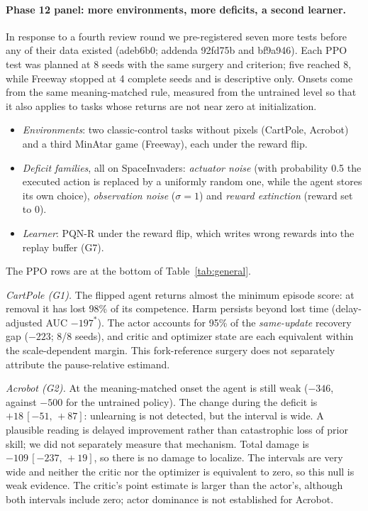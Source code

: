 \documentclass[10pt]{article} %
\newcommand{\sig}{^{\ast}}
\newcommand{\ci}[2]{\,[#1,\,#2]}
\begin{document}
\paragraph{Phase 12 panel: more environments, more deficits, a second learner.}
In response to a fourth review round we pre-registered seven more tests before any of their data existed (adeb6b0; addenda 92fd75b and bf9a946). Each PPO test was planned at 8 seeds with the same surgery and criterion; five reached 8, while Freeway stopped at 4 complete seeds and is descriptive only. Onsets come from the same meaning-matched rule, measured from the untrained level so that it also applies to tasks whose returns are not near zero at initialization.
\begin{itemize}
\item \emph{Environments}: two classic-control tasks without pixels (CartPole, Acrobot) and a third MinAtar game (Freeway), each under the reward flip.
\item \emph{Deficit families}, all on SpaceInvaders: \emph{actuator noise} (with probability 0.5 the executed action is replaced by a uniformly random one, while the agent stores its own choice), \emph{observation noise} ($\sigma=1$) and \emph{reward extinction} (reward set to 0).
\item \emph{Learner}: PQN-R under the reward flip, which writes wrong rewards into the replay buffer (G7).
\end{itemize}
The PPO rows are at the bottom of Table~\ref{tab:general}.

\emph{CartPole (G1).} The flipped agent returns almost the minimum episode score: at removal it has lost 98\% of its competence. Harm persists beyond lost time (delay-adjusted AUC $-197\sig$). The actor accounts for 95\% of the \emph{same-update} recovery gap ($-223$; 8/8 seeds), and critic and optimizer state are each equivalent within the scale-dependent margin. This fork-reference surgery does not separately attribute the pause-relative estimand.

\emph{Acrobot (G2).} At the meaning-matched onset the agent is still weak ($-346$, against $-500$ for the untrained policy). The change during the deficit is $+18\ci{-51}{+87}$: unlearning is not detected, but the interval is wide. A plausible reading is delayed improvement rather than catastrophic loss of prior skill; we did not separately measure that mechanism. Total damage is $-109\ci{-237}{+19}$, so there is no damage to localize. The intervals are very wide and neither the critic nor the optimizer is equivalent to zero, so this null is weak evidence. The critic's point estimate is larger than the actor's, although both intervals include zero; actor dominance is not established for Acrobot.
\end{document}
